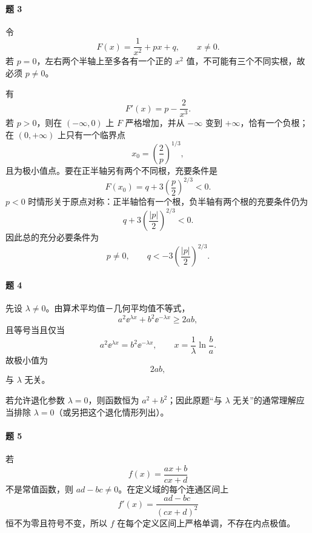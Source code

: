 \paragraph{题 3}
\begin{xsolution}
令
\[
  F(x)=\frac1{x^2}+px+q,\qquad x\ne0.
\]
若 $p=0$，左右两个半轴上至多各有一个正的 $x^2$ 值，不可能有三个不同实根，故必须 $p\ne0$。

有
\[
  F'(x)=p-\frac2{x^3}.
\]
若 $p>0$，则在 $(-\infty,0)$ 上 $F$ 严格增加，并从 $-\infty$ 变到 $+\infty$，恰有一个负根；在 $(0,+\infty)$ 上只有一个临界点
\[
  x_0=\left(\frac2p\right)^{1/3},
\]
且为极小值点。要在正半轴另有两个不同根，充要条件是
\[
  F(x_0)=q+3\left(\frac p2\right)^{2/3}<0.
\]
$p<0$ 时情形关于原点对称：正半轴恰有一个根，负半轴有两个根的充要条件仍为
\[
  q+3\left(\frac{|p|}{2}\right)^{2/3}<0.
\]
因此总的充分必要条件为
\[
  \boxed{p\ne0,\qquad q<-3\left(\frac{|p|}{2}\right)^{2/3}}.
\]
\end{xsolution}

\paragraph{题 4}
\begin{xsolution}
先设 $\lambda\ne0$。由算术平均值－几何平均值不等式，
\[
  a^2\ee^{\lambda x}+b^2\ee^{-\lambda x}
  \ge2ab,
\]
且等号当且仅当
\[
  a^2\ee^{\lambda x}=b^2\ee^{-\lambda x},
  \qquad
  x=\frac1\lambda\ln\frac ba.
\]
故极小值为
\[
  \boxed{2ab},
\]
与 $\lambda$ 无关。

若允许退化参数 $\lambda=0$，则函数恒为 $a^2+b^2$；因此原题“与 $\lambda$ 无关”的通常理解应当排除 $\lambda=0$（或另把这个退化情形列出）。
\end{xsolution}

\paragraph{题 5}
\begin{xsolution}
若
\[
  f(x)=\frac{ax+b}{cx+d}
\]
不是常值函数，则 $ad-bc\ne0$。在定义域的每个连通区间上
\[
  f'(x)=\frac{ad-bc}{(cx+d)^2}
\]
恒不为零且符号不变，所以 $f$ 在每个定义区间上严格单调，不存在内点极值。
\end{xsolution}

